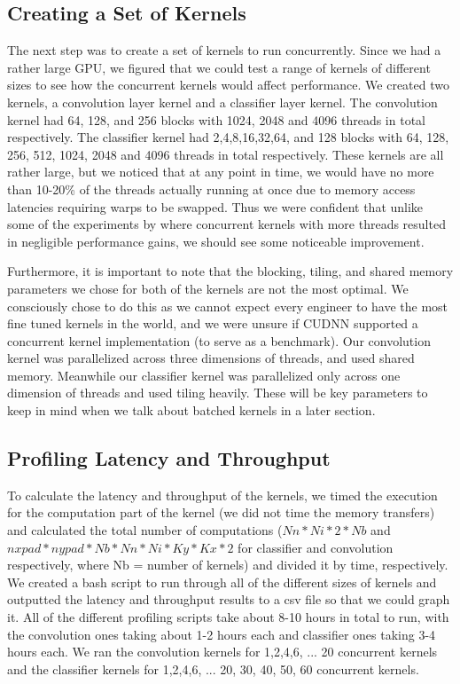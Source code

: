 \documentclass[sigconf]{acmart}
\begin{document}
\subsection{Creating a Set of Kernels	}
The next step was to create a set of kernels to run concurrently. Since we had a rather large GPU, we figured that we could test a range of kernels of different sizes to see how the concurrent kernels would affect performance. We created two kernels, a convolution layer kernel and a classifier layer kernel. The convolution kernel had 64, 128, and 256 blocks with 1024, 2048 and 4096 threads in total respectively. The classifier kernel had 2,4,8,16,32,64, and 128 blocks with 64, 128, 256, 512, 1024, 2048 and 4096 threads in total respectively. These kernels are all rather large, but we noticed that at any point in time, we would have no more than 10-20\% of the threads actually running at once due to memory access latencies requiring warps to be swapped. Thus we were confident that unlike some of the experiments by \cite{wende_cordes_steinke_2012} where concurrent kernels with more threads resulted in negligible performance gains, we should see some noticeable improvement. 

Furthermore, it is important to note that the blocking, tiling, and shared memory parameters we chose for both of the kernels are not the most optimal. We consciously chose to do this as we cannot expect every engineer to have the most fine tuned kernels in the world, and we were unsure if CUDNN supported a concurrent kernel implementation (to serve as a benchmark). Our convolution kernel was parallelized across three dimensions of threads, and used shared memory. Meanwhile our classifier kernel was parallelized only across one dimension of threads and used tiling heavily. These will be key parameters to keep in mind when we talk about batched kernels in a later section. 

\subsection{Profiling Latency and Throughput}

To calculate the latency and throughput of the kernels, we timed the execution for the computation part of the kernel (we did not time the memory transfers) and calculated the total number of computations ($Nn*Ni*2*Nb$ and $nxpad*nypad*Nb*Nn*Ni*Ky*Kx*2$ for classifier and convolution respectively, where Nb = number of kernels) and divided it by time, respectively. We created a bash script to run through all of the different sizes of kernels and outputted the latency and throughput results to a csv file so that we could graph it. All of the different profiling scripts take about 8-10 hours in total to run, with the convolution ones taking about 1-2 hours each and classifier ones taking 3-4 hours each. We ran the convolution kernels for 1,2,4,6, ... 20 concurrent kernels and the classifier kernels for 1,2,4,6, ... 20, 30, 40, 50, 60 concurrent kernels. 
\end{document}
